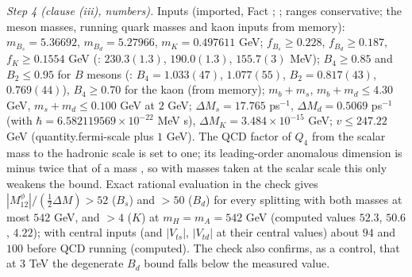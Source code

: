 \emph{Step 4 (clause (iii), numbers).} Inputs (imported, Fact ; \cite{PDG2025, FLAG2024, HPQCD2019}; ranges conservative; the meson masses, running quark masses and kaon inputs from memory): $m_{B_{s}} = 5.36692$, $m_{B_{d}} = 5.27966$, $m_{K} = 0.497611$ GeV; $f_{B_{s}} \ge 0.228$, $f_{B_{d}} \ge 0.187$, $f_{K} \ge 0.1554$ GeV (\cite{FLAG2024}: $230.3(1.3)$, $190.0(1.3)$, $155.7(3)$ MeV); $B_{4} \ge 0.85$ and $B_{2} \le 0.95$ for $B$ mesons (\cite[Table~VI]{HPQCD2019}: $B_{4} = 1.033(47)$, $1.077(55)$, $B_{2} = 0.817(43)$, $0.769(44)$), $B_{4} \ge 0.70$ for the kaon (from memory); $m_{b} + m_{s}$, $m_{b} + m_{d} \le 4.30$ GeV, $m_{s} + m_{d} \le 0.100$ GeV at $2$ GeV; $\Delta M_{s} = 17.765$ ps$^{-1}$, $\Delta M_{d} = 0.5069$ ps$^{-1}$ (with $\hbar = 6.582119569 \times 10^{-22}$ MeV s), $\Delta M_{K} = 3.484 \times 10^{-15}$ GeV; $v \le 247.22$ GeV (quantity.fermi-scale plus $1$ GeV). The QCD factor of $Q_{4}$ from the scalar mass to the hadronic scale is set to one; its leading-order anomalous dimension is minus twice that of a mass \cite{BertoliniMaiezzaNesti2014}, so with masses taken at the scalar scale this only weakens the bound. Exact rational evaluation in the check gives $|M_{12}^{\phi}|/(\tfrac12\Delta M) > 52$ ($B_{s}$) and $> 50$ ($B_{d}$) for every splitting with both masses at most $542$ GeV, and $> 4$ ($K$) at $m_{H} = m_{A} = 542$ GeV (computed values $52.3$, $50.6$, $4.22$); with central inputs (and $|V_{ts}|$, $|V_{td}|$ at their central values) about $94$ and $100$ before QCD running (computed). The check also confirms, as a control, that at $3$ TeV the degenerate $B_{d}$ bound falls below the measured value.

